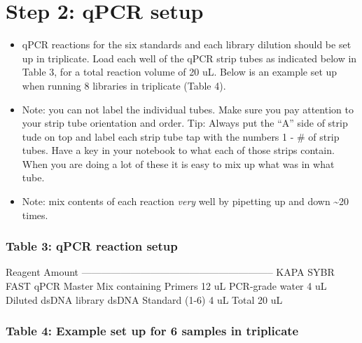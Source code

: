 \documentclass[
  letterpaper,
  DIV=11,
  numbers=noendperiod]{scrreprt}
\begin{document}
\hypertarget{step-2-qpcr-setup}{%
\section*{\texorpdfstring{\textbf{Step 2: qPCR
setup}}{Step 2: qPCR setup}}\label{step-2-qpcr-setup}}


\begin{itemize}
\item
  qPCR reactions for the six standards and each library dilution should
  be set up in triplicate. Load each well of the qPCR strip tubes as
  indicated below in Table 3, for a total reaction volume of 20 uL.
  Below is an example set up when running 8 libraries in triplicate
  (Table 4).
\item
  Note: you can not label the individual tubes. Make sure you pay
  attention to your strip tube orientation and order. Tip: Always put
  the ``A'' side of strip tude on top and label each strip tube tap with
  the numbers 1 - \# of strip tubes. Have a key in your notebook to what
  each of those strips contain. When you are doing a lot of these it is
  easy to mix up what was in what tube.
\item
  Note: mix contents of each reaction \emph{very} well by pipetting up
  and down \textasciitilde20 times.
\end{itemize}

\hypertarget{table-3-qpcr-reaction-setup}{%
\subsubsection*{\texorpdfstring{\textbf{Table 3: qPCR reaction
setup}}{Table 3: qPCR reaction setup}}\label{table-3-qpcr-reaction-setup}}

\textbar{} Reagent \textbar{} Amount \textbar{}
\textbar---------------------------------------------------\textbar--------\textbar{}
\textbar{} KAPA SYBR FAST qPCR Master Mix containing Primers \textbar{}
12 uL \textbar{} \textbar{} PCR-grade water \textbar{} 4 uL \textbar{}
\textbar{} Diluted dsDNA library dsDNA Standard (1-6) \textbar{} 4 uL
\textbar{} \textbar{} Total \textbar{} 20 uL \textbar{}

\hypertarget{table-4-example-set-up-for-6-samples-in-triplicate}{%
\subsubsection*{\texorpdfstring{\textbf{Table 4: Example set up for 6
samples in
triplicate}}{Table 4: Example set up for 6 samples in triplicate}}\label{table-4-example-set-up-for-6-samples-in-triplicate}}
\end{document}

